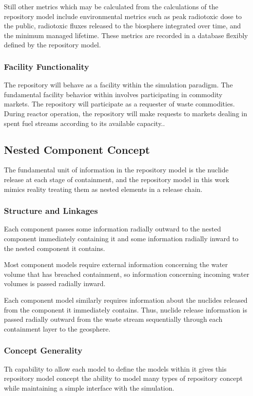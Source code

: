 Still other metrics which may be calculated from the calculations of 
the repository model include environmental metrics such as peak 
radiotoxic dose to the public, radiotoxic fluxes released to the 
biosphere integrated over time, and the minimum managed lifetime.  
These metrics are recorded in a database flexibly defined by the repository 
model.

\subsubsection{Facility Functionality}
The repository will behave as a facility within the \Cyclus simulation 
paradigm. The fundamental facility behavior within \Cyclus involves 
participating in commodity markets. The repository will participate as 
a requester of waste commodities. During reactor operation, the 
repository will make requests to markets dealing in spent fuel streams 
according to its available capacity..

\subsection{Nested Component Concept}
The fundamental unit of information in the repository model is the 
nuclide release at each stage of containment, and the repository model 
in this work mimics reality treating them as nested elements in a 
release chain.

\subsubsection{Structure and Linkages}
Each component passes some information radially outward to the nested 
component immediately containing it and some information radially 
inward to the nested component it contains.

Most component models require external information concerning the 
water volume that has breached containment, so information concerning 
incoming water volumes is passed radially inward. 

Each component model similarly requires information about the nuclides 
released from the component it immediately contains.  Thus, nuclide 
release information is passed radially outward from the waste stream 
sequentially through each containment layer to the geosphere.

\subsubsection{Concept Generality}
Th capability to allow each model to define the models within it gives this 
repository model concept the ability to model many types of repository concept 
while maintaining a simple interface with the simulation. 


